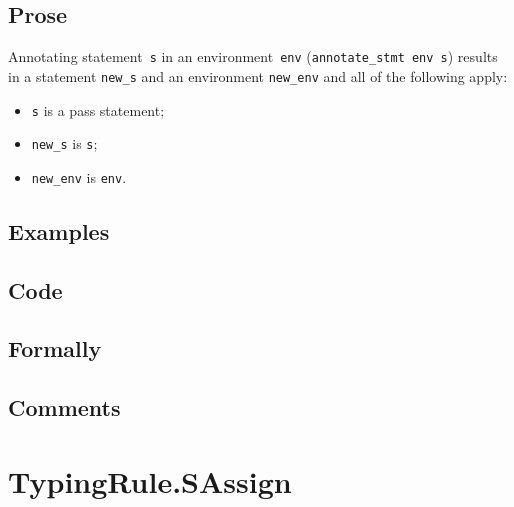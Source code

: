 \documentclass{book}
\begin{document}
    \subsection{Prose}
Annotating statement~\texttt{s} in an environment~\texttt{env}
(\texttt{annotate\_stmt env s}) results in a statement \texttt{new\_s} and an
environment \texttt{new\_env} and all of the following apply:
    \begin{itemize}
    \item \texttt{s} is a pass statement;
    \item \texttt{new\_s} is \texttt{s};
    \item \texttt{new\_env} is \texttt{env}.
    \end{itemize}

    \subsection{Examples}

    \subsection{Code}

    \subsection{Formally}

    \subsection{Comments}

\section{TypingRule.SAssign \label{sec:TypingRule.SAssign}}
\end{document}

